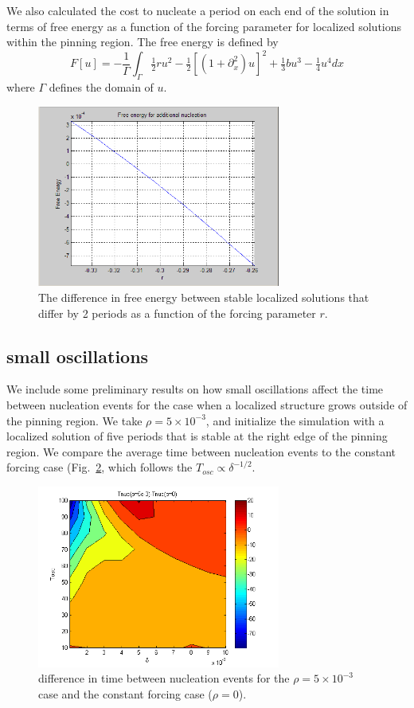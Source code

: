 \documentclass[pre,preprint,superscriptaddress]{revtex4-1}
\begin{document}
We also calculated the cost to nucleate a period on each end of the solution in terms of free energy as a function of the forcing parameter for localized solutions within the pinning region.  The free energy is defined by
\begin{equation}
F[u]=-\frac{1}{\Gamma}\int_{\Gamma}\tfrac{1}{2} r u^2-\tfrac{1}{2}\left[(1+\partial_x^2)u\right]^2+\tfrac{1}{3}b u^3-\tfrac{1}{4}u^4 dx
\end{equation}
where $\Gamma$ defines the domain of $u$.  

\begin{figure}[!htb]\center
\includegraphics[width=80mm]{FEnucleation.png}
\caption{\label{fig:FEnuc} The difference in free energy between stable localized solutions that differ by 2 periods as a function of the forcing parameter $r$.}
\end{figure}
\subsection{small oscillations}
We include some preliminary results on how small oscillations affect the time between nucleation events for the case when a localized structure grows outside of the  pinning region.  We take $\rho=5\times10^{-3}$, and initialize the simulation with a localized solution of five periods that is stable at the right edge of the pinning region.  We compare the average time between nucleation events to the constant forcing case (Fig.~\ref{fig:dTnuc}, which follows the $T_{osc}\propto \delta^{-1/2}$.
\begin{figure}[!htb]\center
\includegraphics[width=80mm]{NucleationTimeOscDiff005.png}
\caption{difference in time between nucleation events for the $\rho=5\times10^{-3}$ case and the constant forcing case ($\rho=0$).}
    \label{fig:dTnuc}
\end{figure}
\end{document}

